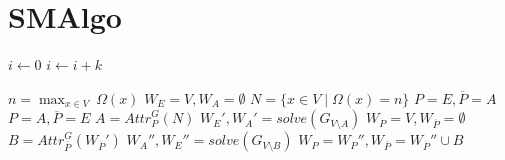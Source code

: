 \documentclass[class=scrartcl,crop=false]{standalone}
\begin{document}
\section{SMAlgo}

\begin{algorithmic}
    \State $i\gets 0$
\Else
        \State $i\gets i+k$
    \EndIf
\EndIf
\end{algorithmic}

\begin{algorithmic}[1]
        \Cmd $n = \max_{x \in V}\ \Omega(x)$
        {
            \Return $W_E = V, W_A = \emptyset$
        }
        {
            \Cmd $N = \{ x \in V \mid \Omega (x) = n\}$
            {
                \Cmd $P = E, \overline{P} = A$
            }
            {
                \Cmd $P = A, \overline{P} = E$
            }
            \Cmd $A = {Attr}_P^G (N)$
            \Cmd $W_E', W_A' = solve (G_{V \setminus A})$
            {
                \Return $W_P = V, W_{\overline{P}} = \emptyset$
            }
            {
                \Cmd $B = {Attr}_{\overline{P}}^G ( W_{\overline{P}}' )$
                \Cmd $W_A'', W_E'' = solve (G_{V \setminus B})$
                \Return $W_P = W_P'', W_{\overline{P}} = W_{\overline{P}}'' \cup B$
            }
        }
\end{algorithmic}
\end{document}
